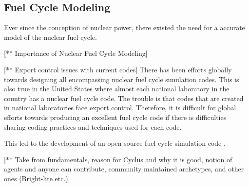 \subsection{Fuel Cycle Modeling}
Ever since the conception of nuclear power, there existed the need 
for a accurate model of the nuclear fuel cycle. 

[** Importance of Nuclear Fuel Cycle Modeling]

[** Export control issues with current codes]
There has been efforts globally towards designing all encompassing 
nuclear fuel cycle simulation codes. 
This is also true in the United States where almost each national 
laboratory in the country has a nuclear fuel cycle code. 
The trouble is that codes that are created in national laboratories 
face export control. 
Therefore, it is difficult for global efforts towards producing 
an excellent fuel cycle code if there is difficulties sharing 
coding practices and techniques used for each code. 

This led to the development of an open source fuel cycle simulation 
code \Cyclus. 

[** Take from fundamentals, reason for Cyclus and why it is good, 
\Cyclus notion of agents and anyone can contribute, \Cyclus 
community maintained archetypes, and other ones (Bright-lite etc.)]

